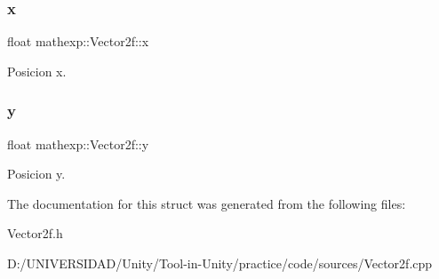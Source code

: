 \subsubsection{\texorpdfstring{x}{x}}
{\footnotesize\ttfamily float mathexp\+::\+Vector2f\+::x}



Posicion x. 

\mbox{\label{structmathexp_1_1_vector2f_ac757b6e37f124a0d6719c0bcb01207ad}} 
\subsubsection{\texorpdfstring{y}{y}}
{\footnotesize\ttfamily float mathexp\+::\+Vector2f\+::y}



Posicion y. 



The documentation for this struct was generated from the following files\+:\begin{DoxyCompactItemize}
\item 
Vector2f.\+h\item 
D\+:/\+U\+N\+I\+V\+E\+R\+S\+I\+D\+A\+D/\+Unity/\+Tool-\/in-\/\+Unity/practice/code/sources/Vector2f.\+cpp\end{DoxyCompactItemize}
